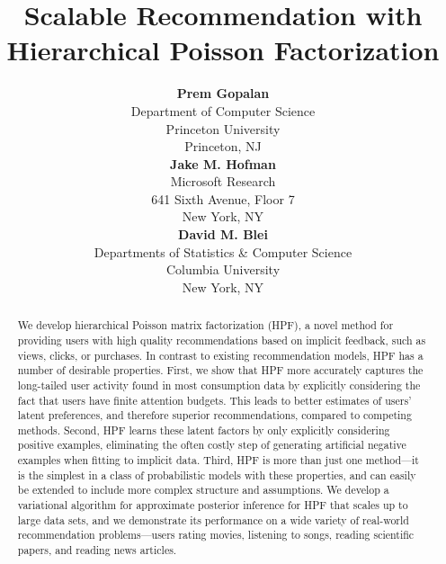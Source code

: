 \documentclass[]{article}
\title{Scalable Recommendation with Hierarchical Poisson
  Factorization}
\author{ {\bf Prem Gopalan} \\
Department of Computer Science \\
Princeton University \\
Princeton, NJ \\
\And
{\bf Jake M. Hofman} \\
Microsoft Research \\
641 Sixth Avenue, Floor 7 \\
New York, NY \\
\And
{\bf David M. Blei} \\
Departments of Statistics \& Computer Science \\
Columbia University \\
New York, NY \\
}
\begin{document}
\maketitle

\begin{abstract}
We develop hierarchical Poisson matrix factorization (HPF), a novel
method for providing users with high quality recommendations based on
implicit feedback, such as views, clicks, or purchases.  In contrast
to existing recommendation models, HPF has a number of desirable
properties.  First, we show that HPF more accurately captures the
long-tailed user activity found in most consumption data by explicitly
considering the fact that users have finite attention budgets.  This
leads to better estimates of users' latent preferences, and therefore
superior recommendations, compared to competing methods.  Second, HPF
learns these latent factors by only explicitly considering positive
examples, eliminating the often costly step of generating artificial
negative examples when fitting to implicit data.  Third, HPF is more
than just one method---it is the simplest in a class of probabilistic
models with these properties, and can easily be extended to include
more complex structure and assumptions.  We develop a variational
algorithm for approximate posterior inference for HPF that scales up
to large data sets, and we demonstrate its performance on a wide
variety of real-world recommendation problems---users rating movies,
listening to songs, reading scientific papers, and reading news
articles.  
\end{abstract}








\small{
  
  
}

\newpage
\appendix

\end{document}
